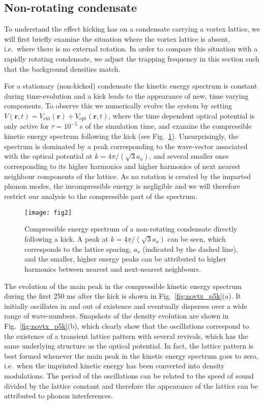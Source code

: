     	\subsection{Non-rotating condensate}

    To understand the effect kicking has on a condensate carrying a vortex lattice, we will first briefly examine the situation where the vortex lattice is absent, i.e.~where there is no external rotation. In order to compare this situation with a rapidly rotating condensate, we adjust the trapping frequency in this section such that the background densities match.

    For a stationary (non-kicked) condensate the kinetic energy spectrum is constant during time-evolution and a kick leads to the appearance of new, time varying components. To observe this we numerically evolve the system by setting $V(\mathbf{r},t) = V_{\text{ext}}(\mathbf{r}) + V_{\text{opt}}(\mathbf{r},t)$, where the time dependent optical potential is only active for $\tau=10^{-5}$ s of the simulation time, and examine the compressible kinetic energy spectrum following the kick (see Fig.~\ref{fig:ekc_eki_novtx}). Unsurprisingly, the spectrum is dominated by a peak corresponding to the wave-vector associated with the optical potential at $k=4\pi/(\sqrt{3}a_o)$, and several smaller ones corresponding to its higher harmonics and higher harmonics of next nearest neighbour components of the lattice. As no rotation is created by the imparted phonon modes, the incompressible energy is negligible and we will therefore restrict our analysis to the compressible part of the spectrum.

    		\begin{figure}[tb]
    			\texttt{[image: fig2]}
    			\caption{Compressible energy spectrum of a non-rotating condensate directly following a kick. A peak at $k=4\pi/(\sqrt{3}a_o)$ can be seen, which corresponds to the  lattice spacing, $a_o$ (indicated by the dashed line), and the smaller, higher energy peaks can be attributed to higher harmonics between nearest and next-nearest neighbours. }
    			\label{fig:ekc_eki_novtx}
    		\end{figure}

    The evolution of the main peak in the compressible kinetic energy spectrum during the first 250 ms after the kick is shown in Fig.~\ref{fig:novtx_p5k}(a). It initially oscillates in and out of existence and eventually disperses over a wide range of wave-numbers. Snapshots of the density evolution are shown in Fig.~\ref{fig:novtx_p5k}(b), which clearly show that the oscillations correspond to the existence of a transient lattice pattern with several revivals, which has the same underlying structure as the optical potential. In fact, the lattice pattern is best formed whenever the main peak in the kinetic energy spectrum goes to zero, i.e.~when the imprinted kinetic energy has been converted into density modulations. The period of the oscillations can be related to the speed of sound divided by the lattice constant and therefore the appearance of the lattice can be attributed to phonon interferences.

